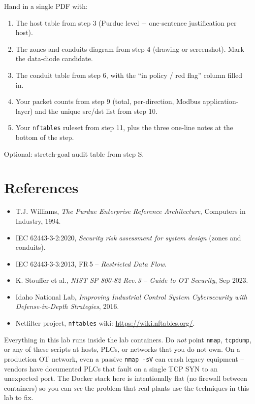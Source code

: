 \documentclass[11pt,a4paper]{article}
\begin{document}
\begin{deliverbox}
Hand in a single PDF with:
\begin{enumerate}\setlength{\itemsep}{2pt}
  \item The host table from step 3 (Purdue level + one-sentence
        justification per host).
  \item The zones-and-conduits diagram from step 4 (drawing or
        screenshot). Mark the data-diode candidate.
  \item The conduit table from step 6, with the ``in policy / red flag''
        column filled in.
  \item Your packet counts from step 9 (total, per-direction, Modbus
        application-layer) and the unique src/dst list from step 10.
  \item Your \texttt{nftables} ruleset from step 11, plus the three
        one-line notes at the bottom of the step.
\end{enumerate}
Optional: stretch-goal audit table from step S.
\end{deliverbox}

\section*{References}

\begin{itemize}\setlength{\itemsep}{2pt}
  \item T.J. Williams, \emph{The Purdue Enterprise Reference
        Architecture}, Computers in Industry, 1994.
  \item IEC 62443-3-2:2020, \emph{Security risk assessment for system
        design} (zones and conduits).
  \item IEC 62443-3-3:2013, FR\,5 -- \emph{Restricted Data Flow}.
  \item K. Stouffer et al., \emph{NIST SP 800-82 Rev.\,3 -- Guide to OT
        Security}, Sep 2023.
  \item Idaho National Lab, \emph{Improving Industrial Control System
        Cybersecurity with Defense-in-Depth Strategies}, 2016.
  \item Netfilter project, \texttt{nftables} wiki:
        \url{https://wiki.nftables.org/}.
\end{itemize}

\begin{warnbox}
Everything in this lab runs inside the lab containers. Do \emph{not}
point \texttt{nmap}, \texttt{tcpdump}, or any of these scripts at hosts,
PLCs, or networks that you do not own. On a production OT network, even
a passive \texttt{nmap -sV} can crash legacy equipment -- vendors have
documented PLCs that fault on a single TCP SYN to an unexpected port.
The Docker stack here is intentionally flat (no firewall between
containers) so you can \emph{see} the problem that real plants use the
techniques in this lab to fix.
\end{warnbox}
\end{document}
